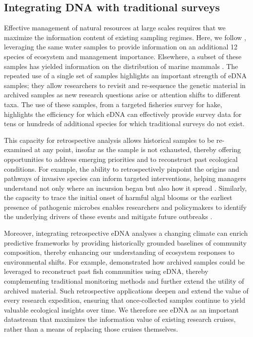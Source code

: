 \documentclass{article}
\begin{document}
\subsection*{Integrating DNA with traditional surveys}
Effective management of natural resources at large scales requires that we maximize the information content of existing sampling regimes. Here, we follow \cite{shelton2022}, leveraging the same water samples to provide information on an additional 12 species of ecosystem and management importance. Elsewhere, a subset of these samples has yielded information on the distribution of marine mammals \cite{valdiviacarrillo2025}. The repeated use of a single set of samples highlights an important strength of eDNA samples; they allow researchers to revisit and re-sequence the genetic material in archived samples as new research questions arise or attention shifts to different taxa. The use of these samples, from a targeted fisheries survey for hake, highlights the efficiency for which eDNA can effectively provide survey data for tens or hundreds of additional species for which traditional surveys do not exist. 

This capacity for retrospective analysis allows historical samples to be re-examined at any point, insofar as the sample is not exhausted, thereby offering opportunities to address emerging priorities and to reconstruct past ecological conditions. For example, the ability to retrospectively pinpoint the origins and pathways of invasive species can inform targeted interventions, helping managers understand not only where an incursion began but also how it spread \cite{gilbey2021}. Similarly, the capacity to trace the initial onset of harmful algal blooms or the earliest presence of pathogenic microbes enables researchers and policymakers to identify the underlying drivers of these events and mitigate future outbreaks \cite{shaw2019}. 

Moreover, integrating retrospective eDNA analyses a changing climate can enrich predictive frameworks by providing historically grounded baselines of community composition, thereby enhancing our understanding of ecosystem responses to environmental shifts. For example, \cite{diaz2020} demonstrated how archived samples could be leveraged to reconstruct past fish communities using eDNA, thereby complementing traditional monitoring methods and further extend the utility of archived material. Such retrospective applications deepen and extend the value of every research expedition, ensuring that once-collected samples continue to yield valuable ecological insights over time. We therefore see eDNA as an important datastream that maximizes the information value of existing research cruises, rather than a means of replacing those cruises themselves.
\end{document}
